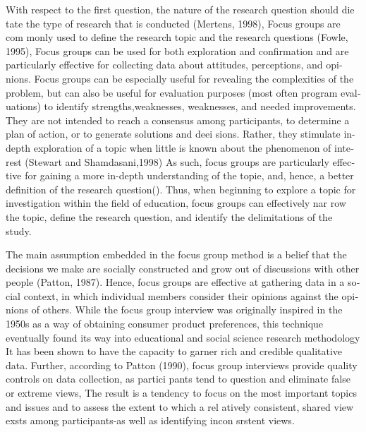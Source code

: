 \documentclass[a4 paper,12pt]{article}\usepackage{xepersian}
\begin{document}
\begin{latin}
With respect to the first  question, the  nature of the research question should die­ tate  the  type  of research  that  is conducted (Mertens, 1998), Focus  groups are  com­ monly used  to define the  research topic and  the  research questions  (Fowle, 1995), Focus groups can  be used  for  both exploration and  confirmation and are  particularly effective  for collecting data about  attitudes, perceptions, and opinions.  Focus groups can  be especially  useful  for revealing  the  complexities of the problem, but can  also be useful  for evaluation purposes (most  often program evaluations) to  identify strengths,weaknesses, weaknesses, and  needed improvements. They are not intended to reach a consensus among participants, to determine a plan of action, or to generate solutions and deei­ sions. Rather, they  stimulate in-depth exploration of a topic when  little is known  about the phenomenon of interest (Stewart and Shamdasani,1998) As such, focus groups are particularly effective for gaining a more in-depth understanding  of  the topie, and, hence, a better definition of the  research question(). Thus, when beginning to explore a topic for  investigation within the field of education, focus groups can  effectively nar­ row  the topic, define the research question, and  identify the delimitations of the study.

\vspace{0.1cm}
\vspace{0.1cm}

\vspace{0.1cm}
\vspace{0.1cm}
\noindent
The  main assumption embedded in  the  focus group method is a belief that the
decisions we make are  socially   constructed  and  grow out  of discussions with other people (Patton,  1987). Hence, focus groups are  effective at  gathering data  in  a social context, in  which  individual members consider their opinions against the opinions of others. While the focus  group interview was originally  inspired in the  1950s as a way of obtaining consumer product preferences, this  technique eventually  found  its way into educational and  social science research  methodology  It has  been shown  to have the capacity  to garner rich  and credible qualitative  data.  Further, according to Patton (1990), focus group interviews provide quality  controls on  data  collection, as partici­ pants  tend to question and eliminate false or extreme views, The result  is a tendency to focus on the most  important topics and issues and  to assess the extent to which  a rel­ atively  consistent, shared view exsts among participants-as well as identifying incon srstent views.
\vspace{0.1cm}
\vspace{0.1cm}


\end{latin}
\end{document}
